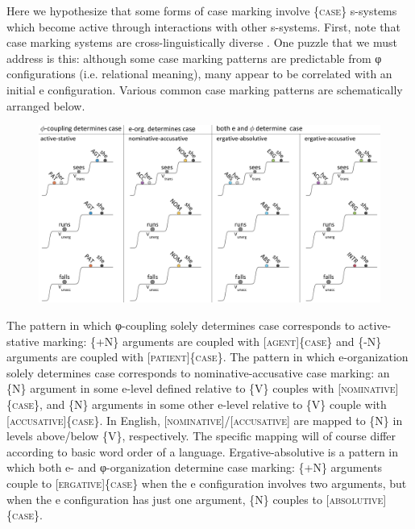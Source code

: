   Here we hypothesize that some forms of case marking involve \{\textsc{case}\} s-systems which become active through interactions with other s-systems. First, note that case marking systems are cross-linguistically diverse \citep{MalchukovSpencer2008}. One puzzle that we must address is this: although some case marking patterns are predictable from φ configurations (i.e. relational meaning), many appear to be correlated with an initial e configuration. Various common case marking patterns are schematically arranged below. 

  
\begin{figure}
\includegraphics[width=\textwidth]{figures/Tilsen-img70.png}
\caption{\missingcaption}
\label{fig:4:20}
\end{figure}
 

  The pattern in which φ-coupling solely determines case corresponds to active-stative marking: \{+N\} arguments are coupled with [\textsc{agent}]\{\textsc{case}\} and \{-N\} arguments are coupled with [\textsc{patient}]\{\textsc{case}\}. The pattern in which e-organization solely determines case corresponds to nominative-accusative case marking: an \{N\} argument in some e-level defined relative to \{V\} couples with [\textsc{nominative}]\{\textsc{case}\}, and \{N\} arguments in some other e-level relative to \{V\} couple with [\textsc{accusative}]\{\textsc{case\}}. In English, [\textsc{nominative}]/[\textsc{accusative}] are mapped to \{N\} in levels above/below \{V\}, respectively. The specific mapping will of course differ according to basic word order of a language. Ergative-absolutive is a pattern in which both e- and φ-organization determine case marking: \{+N\} arguments couple to [\textsc{ergative}]\{\textsc{case}\} when the e configuration involves two arguments, but when the e configuration has just one argument, \{N\} couples to [\textsc{absolutive}]\{\textsc{case}\}.

